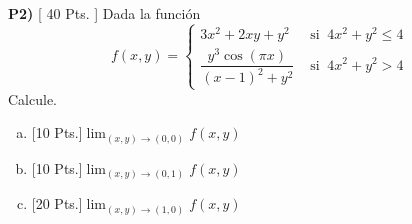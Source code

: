 \documentclass{article}
\begin{document}
\newpage
\noindent\textbf{P2) } \textsf{[ 40 Pts. ]} Dada la función
  $$f(x,y) =\begin{cases}
    3x^2+2xy+y^2  & \textrm{ si }\ 4x^2+y^2\leq 4\\
    \dfrac{y^3\cos(\pi x)}{(x-1)^2+y^2}  & \textrm{ si }\ 4x^2+y^2>4
  \end{cases}$$
  Calcule.
  \begin{enumerate}[a)]
    \item \textsf{[10 Pts.]}$\displaystyle\lim_{(x,y)\to(0,0)}f(x,y)$
    \item \textsf{[10 Pts.]}$\displaystyle\lim_{(x,y)\to(0,1)}f(x,y)$
    \item \textsf{[20 Pts.]}$\displaystyle\lim_{(x,y)\to(1,0)}f(x,y)$
  \end{enumerate}
\end{document}
